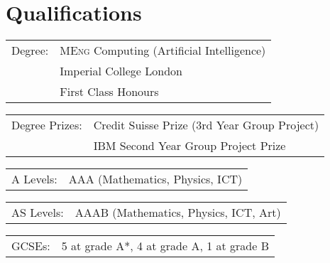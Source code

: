 \section*{Qualifications}

\begin{tabular}{R{3cm} l}

Degree: & \textsc{MEng} Computing (Artificial Intelligence)\\
 & Imperial College London\\
 & First Class Honours

\end{tabular}

\begin{tabular}{R{3cm} l}
Degree Prizes: & Credit Suisse Prize (3rd Year Group Project)\\
 & IBM Second Year Group Project Prize

\end{tabular}


\begin{tabular}{R{3cm} l}	

A Levels: & AAA (Mathematics, Physics, ICT)

\end{tabular}

\begin{tabular}{R{3cm} l}	
AS Levels: & AAAB (Mathematics, Physics, ICT, Art)
\end{tabular}

\begin{tabular}{R{3cm} l}	
GCSEs: & 5 at grade A*, 4 at grade A, 1 at grade B
\end{tabular}